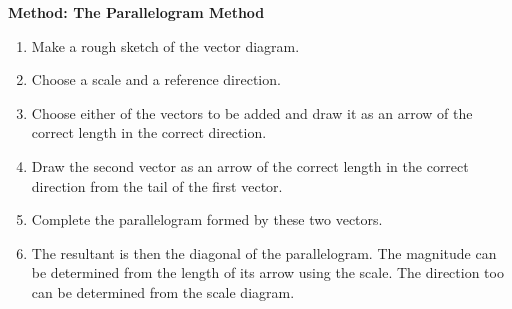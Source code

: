 \begin{minipage}{\textwidth}
\textbf{Method: The Parallelogram Method}
\begin{enumerate}[noitemsep, label=\textbf{\arabic*}.]
\item{Make a rough sketch of the vector diagram.}
\item{Choose a scale and a reference direction.}
\item{Choose either of the vectors to be added and draw it as an arrow
of the correct length in the correct direction.}
\item{Draw the second vector as an arrow of the correct length in the
correct direction from the tail of the first vector.}
\item{Complete the parallelogram formed by these two vectors.}
\item{The resultant is then the diagonal of the parallelogram. The 
magnitude can be determined from the length of its arrow using the
scale. The direction too can be determined from the scale diagram.}
\end{enumerate}
\end{minipage}

